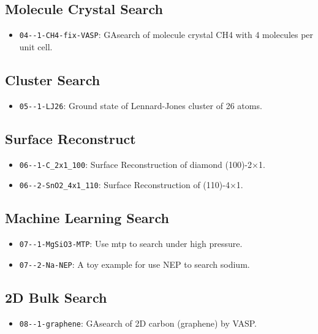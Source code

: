 \documentclass[12pt,oneside]{book}
\begin{document}
\subsection{Molecule Crystal Search}\label{Molecule Crystal Search}
\begin{itemize}
\item \verb|04--1-CH4-fix-VASP|: GAsearch of molecule crystal CH4 with 4 molecules per unit cell.
\end{itemize}

\subsection{Cluster Search}\label{Cluster Search}
\begin{itemize}
\item \verb|05--1-LJ26|: Ground state of Lennard-Jones cluster of 26 atoms.
\end{itemize}

\subsection{Surface Reconstruct}\label{Surface Reconstruct}
\begin{itemize}
\item \verb|06--1-C_2x1_100|: Surface Reconstruction of diamond (100)-2×1.
\item \verb|06--2-SnO2_4x1_110|: Surface Reconstruction of  (110)-4×1.
\end{itemize}

\subsection{Machine Learning Search}\label{Machine Learning Search}
\begin{itemize}
\item \verb|07--1-MgSiO3-MTP|: Use mtp to search  under high pressure.
\item \verb|07--2-Na-NEP|: A toy example for use NEP to search sodium.
\end{itemize}

\subsection{2D Bulk Search}\label{2D Bulk Search}
\begin{itemize}
\item \verb|08--1-graphene|: GAsearch of 2D carbon (graphene) by VASP.
\end{itemize}
\end{document}
